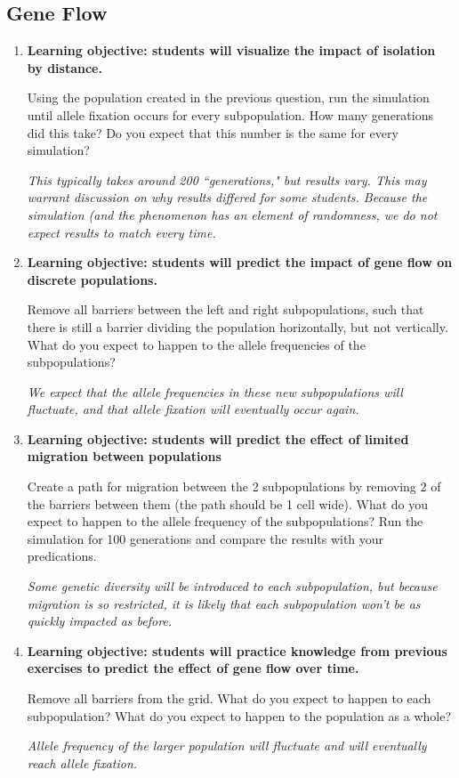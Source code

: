 \documentclass[12pt]{article}
\begin{document}
\begin{spacing}{1.6}
\subsection{Gene Flow}
\begin{enumerate}
\item
\par \textbf{Learning objective: students will visualize the impact of isolation by distance.}
\par Using the population created in the previous question, run the simulation until allele fixation occurs for every subpopulation. How many generations did this take? Do you expect that this number is the same for every simulation?
\par \textit{This typically takes around 200 ``generations," but results vary. This may warrant discussion on why results differed for some students. Because the simulation (and the phenomenon has an element of randomness, we do not expect results to match every time.}
\item
\par \textbf{Learning objective: students will predict the impact of gene flow on discrete populations.}
\par Remove all barriers between the left and right subpopulations, such that there is still a barrier dividing the population horizontally, but not vertically. What do you expect to happen to the allele frequencies of the subpopulations?
\par \textit{We expect that the allele frequencies in these new subpopulations will fluctuate, and that allele fixation will eventually occur again.}
\item
\par \textbf{Learning objective: students will predict the effect of limited migration between populations}
\par Create a path for migration between the 2 subpopulations by removing 2 of the barriers between them (the path should be 1 cell wide). What do you expect to happen to the allele frequency of the subpopulations? Run the simulation for 100 generations and compare the results with your predications.
\par \textit{Some genetic diversity will be introduced to each subpopulation, but because migration is so restricted, it is likely that each subpopulation won't be as quickly impacted as before.}
\item
\par \textbf{Learning objective: students will practice knowledge from previous exercises to predict the effect of gene flow over time.}
\par Remove all barriers from the grid. What do you expect to happen to each subpopulation? What do you expect to happen to the population as a whole?
\par \textit{Allele frequency of the larger population will fluctuate and will eventually reach allele fixation.}
\end{enumerate}


\end{spacing}
\end{document}
